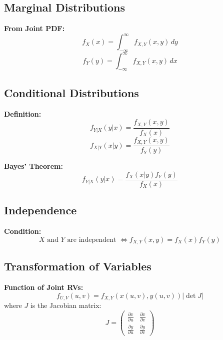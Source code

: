 \documentclass[12pt]{article}
\begin{document}
\subsection{Marginal Distributions}
\textbf{From Joint PDF:}
\[
f_X(x) = \int_{-\infty}^{\infty} f_{X,Y}(x,y) \, dy
\]
\[
f_Y(y) = \int_{-\infty}^{\infty} f_{X,Y}(x,y) \, dx
\]

\subsection{Conditional Distributions}
\textbf{Definition:}
\[
f_{Y|X}(y|x) = \frac{f_{X,Y}(x,y)}{f_X(x)}
\]
\[
f_{X|Y}(x|y) = \frac{f_{X,Y}(x,y)}{f_Y(y)}
\]

\textbf{Bayes’ Theorem:}
\[
f_{Y|X}(y|x) = \frac{f_X(x|y) f_Y(y)}{f_X(x)}
\]

\subsection{Independence}
\textbf{Condition:}
\[
X \text{ and } Y \text{ are independent } \iff f_{X,Y}(x,y) = f_X(x) f_Y(y)
\]

\subsection{Transformation of Variables}
\textbf{Function of Joint RVs:}
\[
f_{U,V}(u,v) = f_{X,Y}(x(u,v), y(u,v)) \left| \det J \right|
\]
where \( J \) is the Jacobian matrix:
\[
J = 
\begin{pmatrix}
\frac{\partial x}{\partial u} & \frac{\partial x}{\partial v} \\
\frac{\partial y}{\partial u} & \frac{\partial y}{\partial v}
\end{pmatrix}
\]
\end{document}
